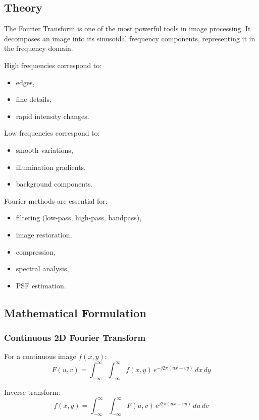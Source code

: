 \documentclass{AnantDocumentation}
\begin{document}
\subsection{Theory}

The Fourier Transform is one of the most powerful tools in image processing.  
It decomposes an image into its sinusoidal frequency components, representing it in the frequency domain.  

High frequencies correspond to:
\begin{itemize}
\item edges,
\item fine details,
\item rapid intensity changes.
\end{itemize}

Low frequencies correspond to:
\begin{itemize}
\item smooth variations,
\item illumination gradients,
\item background components.
\end{itemize}

Fourier methods are essential for:
\begin{itemize}
\item filtering (low-pass, high-pass, bandpass),
\item image restoration,
\item compression,
\item spectral analysis,
\item PSF estimation.
\end{itemize}

\subsection{Mathematical Formulation}

\subsubsection{Continuous 2D Fourier Transform}

For a continuous image $f(x,y)$:
\begin{equation}
F(u,v) = \int_{-\infty}^{\infty}\int_{-\infty}^{\infty}
f(x,y)\, e^{-j2\pi(ux + vy)} \, dx \, dy
\end{equation}

Inverse transform:
\begin{equation}
f(x,y) = \int_{-\infty}^{\infty}\int_{-\infty}^{\infty}
F(u,v)\, e^{j2\pi(ux + vy)} \, du \, dv
\end{equation}
\end{document}
